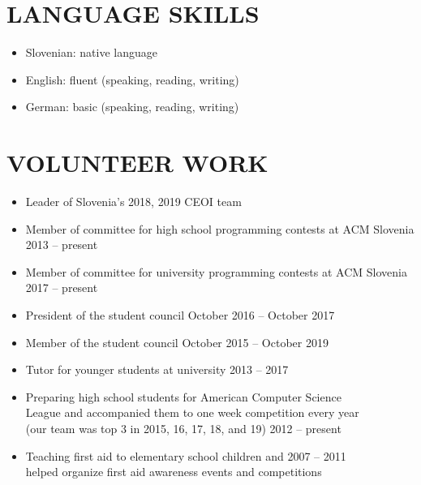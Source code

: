 \documentclass[line,margin]{res}
\begin{document}
\section{LANGUAGE SKILLS}
\begin{itemize}
  \item Slovenian: native language
  \item English: fluent (speaking, reading, writing)
  \item German: basic (speaking, reading, writing)
\end{itemize}

\section{VOLUNTEER WORK}
\begin{itemize}
  \item Leader of Slovenia's 2018, 2019 CEOI team
  \item Member of committee for high school programming contests at ACM Slovenia \\ \hspace*{\fill} 2013 -- present
  \item Member of committee for university programming contests at ACM Slovenia \\ \hspace*{\fill} 2017 -- present
  \item President of the student council \hfill October 2016 -- October 2017 \\
  \item Member of the student council \hfill October 2015 -- October 2019 \\
  \item Tutor for younger students at university \hfill 2013 -- 2017
  \item Preparing high school students for American Computer Science \\ League and
  accompanied them to one week competition every year \\
  (our team was top 3 in 2015, 16, 17, 18, and 19)  \hfill 2012 -- present
  \item Teaching first aid to elementary school children and \hfill 2007 -- 2011 \\
  helped organize first aid awareness events and competitions
\end{itemize}


%
%
\end{document}
